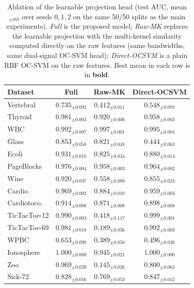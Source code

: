 \documentclass[times, review, 10pt]{elsarticle}
\begin{document}
\begin{table}[t]
\centering
\caption{Ablation of the learnable projection head (test AUC, mean$_{\pm\text{std}}$ over
seeds $0,1,2$ on the same 50/50 splits as the main experiments). \emph{Full} is the proposed
model; \emph{Raw-MK} replaces the learnable projection with the multi-kernel similarity
computed directly on the raw features (same bandwidths, same dual-signal OC-SVM head);
\emph{Direct-OCSVM} is a plain RBF OC-SVM on the raw features. Best mean in each row is in
\textbf{bold}.}
\label{tab:projhead}
\small
\setlength{\tabcolsep}{6pt}
\begin{tabular}{lccc}
\toprule
Dataset & Full & Raw-MK & Direct-OCSVM\\
\midrule
Vertebral     & $\mathbf{0.735}_{\pm0.092}$ & $0.412_{\pm0.011}$ & $0.548_{\pm0.078}$ \\
Thyroid       & $\mathbf{0.981}_{\pm0.003}$ & $0.920_{\pm0.006}$ & $0.958_{\pm0.002}$ \\
WBC           & $0.992_{\pm0.007}$ & $\mathbf{0.997}_{\pm0.001}$ & $0.995_{\pm0.004}$ \\
Glass         & $\mathbf{0.853}_{\pm0.058}$ & $0.821_{\pm0.048}$ & $0.444_{\pm0.063}$ \\
Ecoli         & $\mathbf{0.931}_{\pm0.010}$ & $0.825_{\pm0.034}$ & $0.880_{\pm0.014}$ \\
PageBlocks    & $\mathbf{0.976}_{\pm0.004}$ & $0.958_{\pm0.003}$ & $0.964_{\pm0.002}$ \\
Wine          & $\mathbf{0.920}_{\pm0.037}$ & $0.558_{\pm0.088}$ & $0.855_{\pm0.023}$ \\
Cardio        & $\mathbf{0.969}_{\pm0.002}$ & $0.884_{\pm0.010}$ & $0.959_{\pm0.003}$ \\
Cardiotoco.   & $\mathbf{0.914}_{\pm0.008}$ & $0.871_{\pm0.008}$ & $0.898_{\pm0.008}$ \\
TicTacToe-12  & $0.990_{\pm0.003}$ & $0.418_{\pm0.117}$ & $\mathbf{0.999}_{\pm0.001}$ \\
TicTacToe-69  & $0.981_{\pm0.018}$ & $0.189_{\pm0.036}$ & $\mathbf{0.992}_{\pm0.003}$ \\
WPBC          & $\mathbf{0.653}_{\pm0.090}$ & $0.389_{\pm0.050}$ & $0.496_{\pm0.026}$ \\
Ionosphere    & $\mathbf{1.000}_{\pm0.000}$ & $0.945_{\pm0.021}$ & $\mathbf{1.000}_{\pm0.000}$ \\
Zoo           & $\mathbf{0.969}_{\pm0.020}$ & $0.145_{\pm0.026}$ & $0.800_{\pm0.063}$ \\
Sick-72       & $0.828_{\pm0.016}$ & $0.769_{\pm0.053}$ & $\mathbf{0.847}_{\pm0.012}$ \\

\end{tabular}
\end{table}
\end{document}
